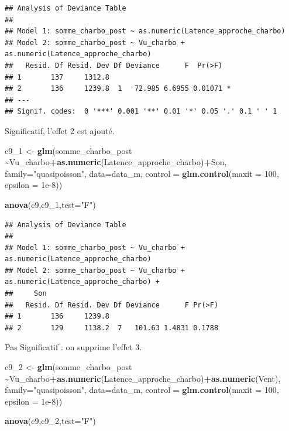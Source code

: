 \documentclass[
  french,
]{article}
\newenvironment{Shaded}{\begin{snugshade}}{\end{snugshade}}
\newcommand{\AttributeTok}[1]{\textcolor[rgb]{0.13,0.29,0.53}{#1}}
\newcommand{\DecValTok}[1]{\textcolor[rgb]{0.00,0.00,0.81}{#1}}
\newcommand{\FloatTok}[1]{\textcolor[rgb]{0.00,0.00,0.81}{#1}}
\newcommand{\FunctionTok}[1]{\textcolor[rgb]{0.13,0.29,0.53}{\textbf{#1}}}
\newcommand{\NormalTok}[1]{#1}
\newcommand{\OtherTok}[1]{\textcolor[rgb]{0.56,0.35,0.01}{#1}}
\newcommand{\SpecialCharTok}[1]{\textcolor[rgb]{0.81,0.36,0.00}{\textbf{#1}}}
\newcommand{\StringTok}[1]{\textcolor[rgb]{0.31,0.60,0.02}{#1}}
\begin{document}
\begin{verbatim}
## Analysis of Deviance Table
## 
## Model 1: somme_charbo_post ~ as.numeric(Latence_approche_charbo)
## Model 2: somme_charbo_post ~ Vu_charbo + as.numeric(Latence_approche_charbo)
##   Resid. Df Resid. Dev Df Deviance      F  Pr(>F)  
## 1       137     1312.8                             
## 2       136     1239.8  1   72.985 6.6955 0.01071 *
## ---
## Signif. codes:  0 '***' 0.001 '**' 0.01 '*' 0.05 '.' 0.1 ' ' 1
\end{verbatim}

Significatif, l'effet 2 est ajouté.

\begin{Shaded}
\begin{Highlighting}[]
\NormalTok{c9\_1 }\OtherTok{\textless{}{-}} \FunctionTok{glm}\NormalTok{(somme\_charbo\_post }\SpecialCharTok{\textasciitilde{}}\NormalTok{Vu\_charbo}\SpecialCharTok{+}\FunctionTok{as.numeric}\NormalTok{(Latence\_approche\_charbo)}\SpecialCharTok{+}\NormalTok{Son, }\AttributeTok{family=}\StringTok{"quasipoisson"}\NormalTok{, }\AttributeTok{data=}\NormalTok{data\_m, }
            \AttributeTok{control =} \FunctionTok{glm.control}\NormalTok{(}\AttributeTok{maxit =} \DecValTok{100}\NormalTok{, }\AttributeTok{epsilon =} \FloatTok{1e{-}8}\NormalTok{))}

\FunctionTok{anova}\NormalTok{(c9,c9\_1,}\AttributeTok{test=}\StringTok{"F"}\NormalTok{)}
\end{Highlighting}
\end{Shaded}

\begin{verbatim}
## Analysis of Deviance Table
## 
## Model 1: somme_charbo_post ~ Vu_charbo + as.numeric(Latence_approche_charbo)
## Model 2: somme_charbo_post ~ Vu_charbo + as.numeric(Latence_approche_charbo) + 
##     Son
##   Resid. Df Resid. Dev Df Deviance      F Pr(>F)
## 1       136     1239.8                          
## 2       129     1138.2  7   101.63 1.4831 0.1788
\end{verbatim}

Pas Significatif : on supprime l'effet 3.

\begin{Shaded}
\begin{Highlighting}[]
\NormalTok{c9\_2 }\OtherTok{\textless{}{-}} \FunctionTok{glm}\NormalTok{(somme\_charbo\_post }\SpecialCharTok{\textasciitilde{}}\NormalTok{Vu\_charbo}\SpecialCharTok{+}\FunctionTok{as.numeric}\NormalTok{(Latence\_approche\_charbo)}\SpecialCharTok{+}\FunctionTok{as.numeric}\NormalTok{(Vent), }\AttributeTok{family=}\StringTok{"quasipoisson"}\NormalTok{, }\AttributeTok{data=}\NormalTok{data\_m, }
            \AttributeTok{control =} \FunctionTok{glm.control}\NormalTok{(}\AttributeTok{maxit =} \DecValTok{100}\NormalTok{, }\AttributeTok{epsilon =} \FloatTok{1e{-}8}\NormalTok{))}

\FunctionTok{anova}\NormalTok{(c9,c9\_2,}\AttributeTok{test=}\StringTok{"F"}\NormalTok{)}
\end{Highlighting}
\end{Shaded}
\end{document}

